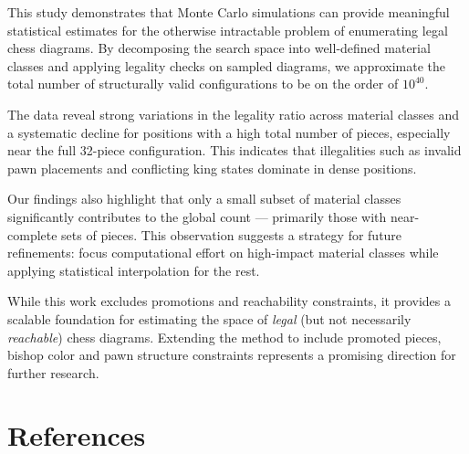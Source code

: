 \documentclass[12pt]{article}
\begin{document}
This study demonstrates that Monte Carlo simulations can provide meaningful statistical estimates for the otherwise intractable problem of enumerating legal chess diagrams. By decomposing the search space into well-defined material classes and applying legality checks on sampled diagrams, we approximate the total number of structurally valid configurations to be on the order of $10^{40}$.

The data reveal strong variations in the legality ratio across material classes and a systematic decline for positions with a high total number of pieces, especially near the full 32-piece configuration. This indicates that illegalities such as invalid pawn placements and conflicting king states dominate in dense positions.

Our findings also highlight that only a small subset of material classes significantly contributes to the global count — primarily those with near-complete sets of pieces. This observation suggests a strategy for future refinements: focus computational effort on high-impact material classes while applying statistical interpolation for the rest.

While this work excludes promotions and reachability constraints, it provides a scalable foundation for estimating the space of \emph{legal} (but not necessarily \emph{reachable}) chess diagrams. Extending the method to include promoted pieces, bishop color and pawn structure constraints represents a promising direction for further research.

\section{References}
\end{document}
